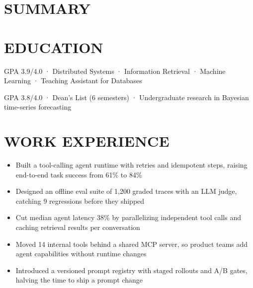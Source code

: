 


\section{SUMMARY}

\section{EDUCATION}

\begin{plainlist}
\item GPA 3.9/4.0 · Distributed Systems · Information Retrieval · Machine Learning · Teaching Assistant for Databases
\end{plainlist}

\begin{plainlist}
\item GPA 3.8/4.0 · Dean's List (6 semesters) · Undergraduate research in Bayesian time-series forecasting
\end{plainlist}

\section{WORK EXPERIENCE}

\begin{itemize}
\item Built a tool-calling agent runtime with retries and idempotent steps, raising end-to-end task success from 61\% to 84\%
\item Designed an offline eval suite of 1,200 graded traces with an LLM judge, catching 9 regressions before they shipped
\item Cut median agent latency 38\% by parallelizing independent tool calls and caching retrieval results per conversation
\item Moved 14 internal tools behind a shared MCP server, so product teams add agent capabilities without runtime changes
\item Introduced a versioned prompt registry with staged rollouts and A/B gates, halving the time to ship a prompt change
\end{itemize}

